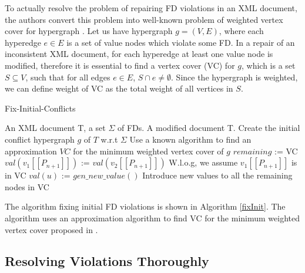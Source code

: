 To actually resolve the problem of repairing FD violations in an XML document, the authors convert this problem into well-known problem of weighted vertex cover for hypergraph \cite{ApproxAlgo}. Let us have hypergraph $g = (V,E)$, where each hyperedge $e \in E$ is a set of value nodes which violate some FD. In a repair of an inconsistent XML document, for each hyperedge at least one value node is modified, therefore it is essential to find a vertex cover (VC) for $g$, which is a set $S \subseteq V$, such that for all edges $e \in E$, $S \cap e \neq \emptyset$. Since the hypergraph is weighted, we can define weight of VC as the total weight of all vertices in $S$.\\

\begin{algorithm}
\caption{Fix-Initial-Conflicts}
\label{fixInit}
\begin{algorithmic}[1]
\REQUIRE An XML document T, a set $\Sigma$ of FDs.
\ENSURE A modified document T.
\STATE \COMMENT Create the initial conflict hypergraph $g$ of $T$ w.r.t $\Sigma$
\STATE \COMMENT Use a known algorithm to find an approximation $VC$ for the minimum weighted vertex cover of $g$
\STATE $remaining$ := VC
\STATE $val(v_1[\![P_{n+1}]\!])$ := $val(v_2[\![P_{n+1}]\!])$ \COMMENT W.l.o.g, we assume $v_1[\![P_{n+1}]\!]$ is in VC
\ENDWHILE
{}
\STATE $val(u)$ := $gen\_new\_value()$
\STATE \COMMENT Introduce new values to all the remaining nodes in VC
\ENDFOR
\end{algorithmic}
\end{algorithm}

The algorithm fixing initial FD violations is shown in Algorithm \ref{fixInit}. The algorithm uses an approximation algorithm to find VC for the minimum weighted vertex cover proposed in \cite{ApproxAlgo}.

\subsection{Resolving Violations Thoroughly}

